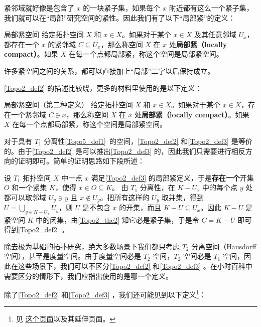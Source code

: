 紧邻域就好像是包含了 $x$ 的一块紧子集，如果每个 $x$ 附近都有这么一个紧子集，我们就可以在“局部”研究空间的紧性。因此我们有了以下“局部紧”的定义：

\begin{definition}{局部紧空间}\label{Topo2_def2}
给定拓扑空间 $X$ 和 $x\in X$。如果对于某个 $x\in X$ 及其任意邻域 $U_x$，都存在一个 $x$ 的紧邻域 $C\subseteq U_x$，那么称空间 $X$ 在 $x$ 处\textbf{局部紧（locally compact）}。如果 $X$ 在每一个点都局部紧，称这个空间是局部紧空间。
\end{definition}

许多紧空间之间的关系，都可以直接加上“局部”二字以后保持成立。

\autoref{Topo2_def2} 的描述比较绕，更多的材料里使用的是以下定义：

\begin{definition}{局部紧空间（第二种定义）}\label{Topo2_def3}
给定拓扑空间 $X$ 和 $x\in X$。如果对于某个 $x\in X$，存在一个紧邻域 $C\ni x$，那么称空间 $X$ 在 $x$ 处\textbf{局部紧（locally compact）}。如果 $X$ 在每一个点都局部紧，称这个空间是局部紧空间。
\end{definition}

对于具有 $T_1$ 分离性\autoref{Topo5_def1}~的空间，\autoref{Topo2_def2} 和\autoref{Topo2_def3} 是等价的。由于\autoref{Topo2_def2} 是可以推出\autoref{Topo2_def3} 的，因此我们只需要进行相反方向的证明即可。简单的证明思路如下段所述：

设 $T_1$ 拓扑空间 $X$ 中一点 $x$ 满足\autoref{Topo2_def3} 的局部紧定义，于是\textbf{存在一个}开集 $O$ 和一个紧集 $K$，使得 $x\in O\subseteq K$。
由 $T_1$ 分离性，在 $K-U_x$ 中的每个点 $y$ 处都可以取邻域 $U_y\ni y$ 且 $x\not\in U_y$。把所有这样的 $U_y$ 取并集，得到 $U=\bigcup\limits_{y\in K-U_x}U_y$，则 $U$ 是不包含 $x$ 的开集，而且 $K-U\subseteq U_x$。因此 $K-U$ 是紧空间 $K$ 中的闭集，由\autoref{Topo2_the2} 知它必是紧子集，于是令 $C=K-U$ 即可得到\autoref{Topo2_def2} 。

除去极为基础的拓扑研究，绝大多数场景下我们都只考虑 $T_2$ 分离空间（Hausdorff空间），甚至是度量空间。由于度量空间必是 $T_2$ 空间，$T_2$ 空间必是 $T_1$ 空间，因此在这些场景下，我们可以不区分\autoref{Topo2_def2} 和\autoref{Topo2_def3} 。在小时百科中需要区分的情形下，我们应指出使用的是哪一个定义。

除了\autoref{Topo2_def2} 和\autoref{Topo2_def3} ，我们还可能见到以下定义\footnote{见 \href{https://proofwiki.org/wiki/Strongly_Locally_Compact_Space_is_Weakly_Locally_Compact}{这个页面}以及其延伸页面。}：

